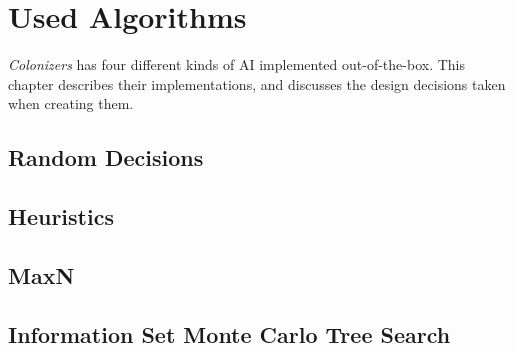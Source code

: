 \chapter{Used Algorithms}

\emph{Colonizers} has four different kinds of AI implemented out-of-the-box.
This chapter describes their implementations, and discusses the design decisions
taken when creating them.

\section{Random Decisions}



\section{Heuristics}

\section{MaxN}
\label{sec:algomaxn}

\section{Information Set Monte Carlo Tree Search}

